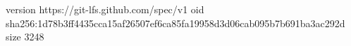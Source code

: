 version https://git-lfs.github.com/spec/v1
oid sha256:1d78b3ff4435cca15af26507ef6ca85fa19958d3d06cab095b7b691ba3ac292d
size 3248
